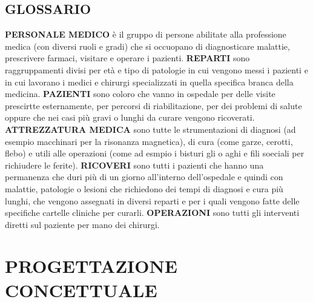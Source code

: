 \documentclass[a4paper, 10pt]{article}
\begin{document}
\subsection{GLOSSARIO}
\textbf{PERSONALE MEDICO} è il gruppo di persone abilitate alla professione medica (con diversi ruoli e gradi) che si occuopano di diagnosticare malattie, prescrivere farmaci, visitare e operare i pazienti. 
\textbf{REPARTI} sono raggruppamenti divisi per età e tipo di patologie in cui vengono messi i pazienti e in cui lavorano i medici e chirurgi specializzati in quella specifica branca della medicina.
\textbf{PAZIENTI} sono coloro che vanno in ospedale per delle visite prescirtte esternamente, per percorsi di riabilitazione, per dei problemi di salute oppure che nei casi più gravi o lunghi da curare vengono ricoverati.
\textbf{ATTREZZATURA MEDICA} sono tutte le strumentazioni di diagnosi (ad esempio macchinari per la risonanza magnetica), di cura (come garze, cerotti, flebo) e utili alle operazioni (come ad esmpio i bisturi gli o aghi e fili soeciali per richiudere le ferite).
\textbf{RICOVERI} sono tutti i pazienti che hanno una permanenza che duri più di un giorno all'interno dell'ospedale e quindi con malattie, patologie o lesioni che richiedono dei tempi di diagnosi e cura più lunghi, che vengono assegnati in diversi reparti e per i quali vengono fatte delle specifiche cartelle cliniche per curarli.
\textbf{OPERAZIONI} sono tutti gli interventi diretti sul paziente per mano dei chirurgi.

\section{PROGETTAZIONE CONCETTUALE}
\end{document}
